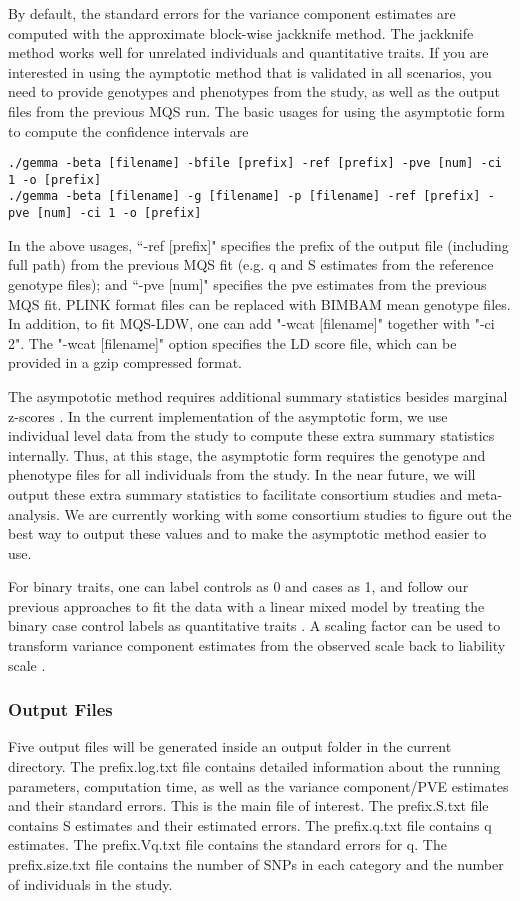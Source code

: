 \documentclass[11pt]{article}
\begin{document}
By default, the standard errors for the variance component estimates are computed with the approximate block-wise jackknife method.  The jackknife method works well for unrelated individuals and quantitative traits. If you are interested in using the aymptotic method that is validated in all scenarios, you need to provide genotypes and phenotypes from the study, as well as the output files from the previous MQS run. The basic usages for using the asymptotic form to compute the confidence intervals are
\begin{verbatim}
./gemma -beta [filename] -bfile [prefix] -ref [prefix] -pve [num] -ci 1 -o [prefix]
./gemma -beta [filename] -g [filename] -p [filename] -ref [prefix] -pve [num] -ci 1 -o [prefix]
\end{verbatim}
In the above usages, ``-ref [prefix]" specifies the prefix of the output file (including full path) from the previous MQS fit (e.g. q and S estimates from the reference genotype files); and ``-pve [num]" specifies the pve estimates from the previous MQS fit. PLINK format files can be replaced with BIMBAM mean genotype files. In addition, to fit MQS-LDW, one can add "-wcat [filename]" together with "-ci 2". The "-wcat [filename]" option specifies the LD score file, which can be provided in a gzip compressed format. 

The asympototic method requires additional summary statistics besides marginal z-scores \cite{Zhou:2016}. In the current implementation of the asymptotic form, we use individual level data from the study to compute these extra summary statistics internally. Thus, at this stage, the asymptotic form requires the genotype and phenotype files for all individuals from the study. In the near future, we will output these extra summary statistics to facilitate consortium studies and meta-analysis. We are currently working with some consortium studies to figure out the best way to output these values and to make the asymptotic method easier to use. 

For binary traits, one can label controls as 0 and cases as 1, and follow our previous approaches to fit the data with a linear mixed model by treating the binary case control labels as quantitative traits \cite{Zhou:2013}. A scaling factor can be used to transform variance component estimates from the observed scale back to liability scale \cite{Zhou:2013}.


\subsubsection{Output Files}
Five output files will be generated inside an output folder in the current directory. The prefix.log.txt file contains detailed information about the running parameters, computation time, as well as the variance component/PVE estimates and their standard errors. This is the main file of interest. The prefix.S.txt file contains S estimates and their estimated errors. The prefix.q.txt file contains q estimates. The prefix.Vq.txt file contains the standard errors for q. The prefix.size.txt file contains the number of SNPs in each category and the number of individuals in the study.
\end{document}
